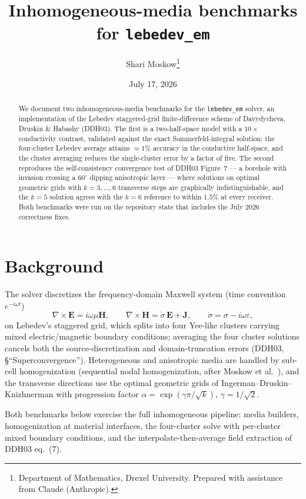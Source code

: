 \documentclass[11pt]{article}
\title{Inhomogeneous-media benchmarks for \texttt{lebedev\_em}}
\author{Shari Moskow\thanks{Department of Mathematics, Drexel University.
Prepared with assistance from Claude (Anthropic).}}
\date{July 17, 2026}
\newcommand{\sdot}{\dot\sigma}
\begin{document}
\maketitle

\begin{abstract}
We document two inhomogeneous-media benchmarks for the \texttt{lebedev\_em}
solver, an implementation of the Lebedev staggered-grid finite-difference
scheme of Davydycheva, Druskin \& Habashy \cite{DDH03} (DDH03). The first is a
two-half-space model with a $10\times$ conductivity contrast, validated
against the exact Sommerfeld-integral solution: the four-cluster Lebedev
average attains $\approx 1\%$ accuracy in the conductive half-space, and the
cluster averaging reduces the single-cluster error by a factor of five. The
second reproduces the self-consistency convergence test of DDH03 Figure~7 ---
a borehole with invasion crossing a $60^\circ$ dipping anisotropic layer ---
where solutions on optimal geometric grids with $k=3,\dots,6$ transverse steps
are graphically indistinguishable, and the $k=5$ solution agrees with the
$k=6$ reference to within $1.5\%$ at every receiver. Both benchmarks were run
on the repository state that includes the July 2026 correctness fixes.
\end{abstract}

\section{Background}

The solver discretizes the frequency-domain Maxwell system (time convention
$e^{-i\omega t}$)
\begin{equation}
\nabla\times \mathbf{E} = i\omega\mu\mathbf{H}, \qquad
\nabla\times \mathbf{H} = \sdot\,\mathbf{E} + \mathbf{J},
\qquad \sdot = \sigma - i\omega\varepsilon,
\end{equation}
on Lebedev's staggered grid, which splits into four Yee-like clusters carrying
mixed electric/magnetic boundary conditions; averaging the four cluster
solutions cancels both the source-discretization and domain-truncation errors
(DDH03, \S``Superconvergence''). Heterogeneous and anisotropic media are
handled by sub-cell homogenization (sequential nodal homogenization, after
Moskow et al.~\cite{MDHLD99}), and the transverse directions use the optimal
geometric grids of Ingerman--Druskin--Knizhnerman with progression factor
$\alpha = \exp(\gamma\pi/\sqrt{k})$, $\gamma = 1/\sqrt2$.

Both benchmarks below exercise the full inhomogeneous pipeline: media
builders, homogenization at material interfaces, the four-cluster solve with
per-cluster mixed boundary conditions, and the interpolate-then-average field
extraction of DDH03 eq.~(7).
\end{document}
